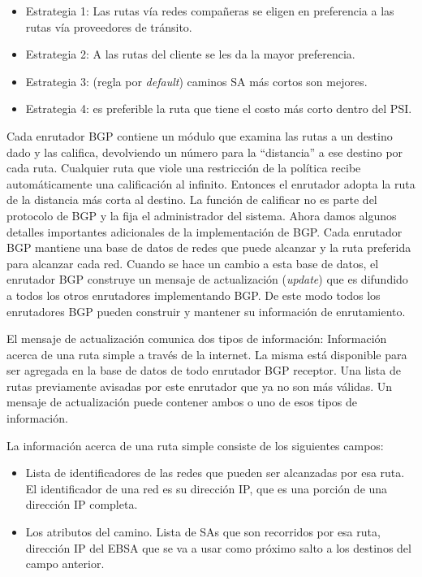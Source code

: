 	\begin{itemize}
		\item Estrategia 1: Las rutas vía redes compañeras se eligen en preferencia a las rutas vía proveedores de tránsito.
		\item Estrategia 2: A las rutas del cliente se les da la mayor preferencia.
		\item Estrategia 3: (regla por \textit{default}) caminos SA más cortos son mejores.
		\item Estrategia 4: es preferible la ruta que tiene el costo más corto dentro del PSI.
	\end{itemize}

	\par Cada enrutador BGP contiene un módulo que examina las rutas a un destino dado y las califica, devolviendo un número para la “distancia” a ese destino por cada ruta. Cualquier ruta que viole una restricción de la política recibe automáticamente una calificación al infinito. Entonces el enrutador adopta la ruta de la distancia más corta al destino. La función de calificar no es parte del protocolo de BGP y la fija el administrador del sistema. Ahora damos algunos detalles importantes adicionales de la implementación de BGP. Cada enrutador BGP mantiene una base de datos de redes que puede alcanzar y la ruta preferida para alcanzar cada red. Cuando se hace un cambio a esta base de datos, el enrutador BGP construye un mensaje de actualización (\textit{update}) que es difundido a todos los otros enrutadores implementando BGP. De este modo todos los enrutadores BGP pueden construir y mantener su información de enrutamiento.

	\par El mensaje de actualización comunica dos tipos de información:
Información acerca de una ruta simple a través de la internet. La misma está disponible para ser agregada en la base de datos de todo enrutador BGP receptor. Una lista de rutas previamente avisadas por este enrutador que ya no son más válidas. Un mensaje de actualización puede contener ambos o uno de esos tipos de información.

	\par La información acerca de una ruta simple consiste de los siguientes campos:
	\begin{itemize}
		\item Lista de identificadores de las redes que pueden ser alcanzadas por esa ruta. El identificador de una red es su dirección IP, que es una porción de una dirección IP completa.
		\item Los atributos del camino. Lista de SAs que son recorridos por esa ruta, dirección IP del EBSA que se va a usar como próximo salto a los destinos del campo anterior.
	\end{itemize}
	
